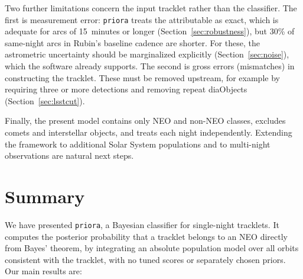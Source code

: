 \documentclass[linenumbers,twocolumn]{aastex701}
\newcommand{\priora}{{\tt priora}\xspace} %
\begin{document}
Two further limitations concern the input tracklet rather than the
classifier. The first is measurement error: \priora treats the attributable
as exact, which is adequate for arcs of 15~minutes or longer
(Section~\ref{sec:robustness}), but 30\% of same-night arcs in Rubin's
baseline cadence are shorter. For these, the astrometric uncertainty should
be marginalized explicitly (Section~\ref{sec:noise}), which the software
already supports. The second is gross errors (mismatches) in constructing the tracklet. These must be removed upstream, for example by
requiring three or more detections and removing repeat diaObjects
(Section~\ref{sec:lsstcut}).


Finally, the present model contains only NEO and non-NEO classes, excludes
comets and interstellar objects, and treats each night independently.
Extending the framework to additional Solar System populations and to
multi-night observations are natural next steps.

\section{Summary}
\label{sec:summary}

We have presented \priora, a Bayesian classifier for single-night tracklets.
It computes the posterior probability that a tracklet belongs to an NEO
directly from Bayes' theorem, by integrating an absolute population model
over all orbits consistent with the tracklet, with no tuned scores or
separately chosen priors. Our main results are:
\end{document}
